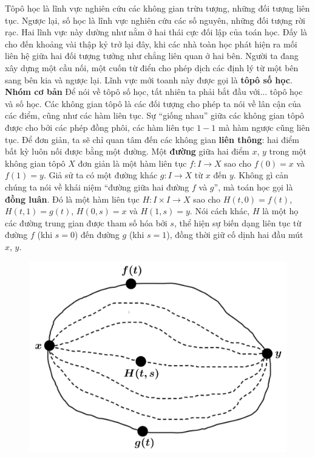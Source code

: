 \begin{multicols}{2}	
	Tôpô học là lĩnh vực nghiên cứu các không gian trừu tượng, những đối tượng liên tục. Ngược lại, số học là lĩnh vực nghiên cứu các số nguyên, những đối tượng rời rạc. Hai lĩnh vực này dường như nằm ở hai thái cực đối lập của toán học. Đấy là cho đến khoảng vài thập kỷ trở lại đây, khi các nhà toàn học phát hiện ra mối liên hệ giữa hai đối tượng tưởng như chẳng liên quan ở hai bên. Người ta đang xây dựng một cầu nối, một cuốn từ điển cho phép dịch các định lý từ một bên sang bên kia và ngược lại. Lĩnh vực mới toanh này được gọi là {\bf\color{duongvaotoanhoc} tôpô số học}.
	\vskip 0.1cm
	\textbf{\color{duongvaotoanhoc}Nhóm cơ bản}
	\vskip 0.1cm
	Để nói về tôpô số học, tất nhiên ta phải bắt đầu với... tôpô học và số học. Các không gian tôpô là các đối tượng cho phép ta nói về lân cận của các điểm, cũng như các hàm liên tục. Sự ``giống nhau'' giữa các không gian tôpô được cho bởi các {phép đồng phôi}, các hàm liên tục $1-1$ mà hàm ngược cũng liên tục. Để đơn giản, ta sẽ chỉ quan tâm đến các không gian {\bf\color{duongvaotoanhoc} liên thông}: hai điểm bất kỳ luôn nối được bằng một đường. Một {\bf\color{duongvaotoanhoc} đường} giữa hai điểm $x$, $y$ trong một không gian tôpô $X$ đơn giản là một hàm liên tục $f: I \to X$ sao cho $f(0) = x$ và $f(1) = y$.
	\vskip 0.1cm
	Giả sử ta có một đường khác $g: I \to X$ từ $x$ đến $y$. Không gì cản chúng ta nói về khái niệm ``đường giữa hai đường $f$ và $g$'', mà toán học gọi là {\bf\color{duongvaotoanhoc} đồng luân}. Đó là một hàm liên tục $H: I \times I \to X$ sao cho $H(t,0) = f(t)$, $H(t,1) = g(t)$, $H(0,s) = x$ và $H(1,s) = y$. Nói cách khác, $H$ là một họ các đường trung gian được tham số hóa bởi $s$, thể hiện sự biến dạng liên tục từ đường $f$ (khi $s=0$) đến đường $g$ (khi $s = 1$), đồng thời giữ cố dịnh hai đầu mút $x$, $y$. 
	\begin{figure}[H]
		\vspace*{-5pt}
		\centering
		\captionsetup{labelformat= empty, justification=centering}
		\includegraphics[width= 0.9\linewidth]{h1.png}

\end{figure}
\end{multicols}
